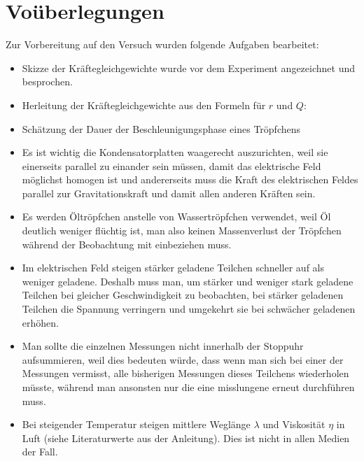 \documentclass[
	a4paper,
	12pt,
	pagesize,
	ngerman
]{scrartcl}
\begin{document}
	\section{Voüberlegungen}
	Zur Vorbereitung auf den Versuch wurden folgende Aufgaben bearbeitet:
	\begin{itemize}
		\item Skizze der Kräftegleichgewichte wurde vor dem Experiment angezeichnet und besprochen.
		\item Herleitung der Kräftegleichgewichte aus den Formeln für $ r $ und $ Q $: %
		\item Schätzung der Dauer der Beschleunigungsphase eines Tröpfchens %
		\item Es ist wichtig die Kondensatorplatten waagerecht auszurichten, weil sie einerseits parallel zu einander sein müssen, damit das elektrische Feld möglichst homogen ist und andererseits muss die Kraft des elektrischen Feldes parallel zur Gravitationskraft und damit allen anderen Kräften sein.
		\item Es werden Öltröpfchen anstelle von Wassertröpfchen verwendet, weil Öl deutlich weniger flüchtig ist, man also keinen Massenverlust der Tröpfchen während der Beobachtung mit einbeziehen muss.
		\item Im elektrischen Feld steigen stärker geladene Teilchen schneller auf als weniger geladene. Deshalb muss man, um stärker und weniger stark geladene Teilchen bei gleicher Geschwindigkeit zu beobachten, bei stärker geladenen Teilchen die Spannung verringern und umgekehrt sie bei schwächer geladenen erhöhen.
		\item Man sollte die einzelnen Messungen nicht innerhalb der Stoppuhr aufsummieren, weil dies bedeuten würde, dass wenn man sich bei einer der Messungen vermisst, alle bisherigen Messungen dieses Teilchens wiederholen müsste, während man ansonsten nur die eine misslungene erneut durchführen muss.
		\item Bei steigender Temperatur steigen mittlere Weglänge $ \lambda $ und Viskosität $ \eta $ in Luft (siehe Literaturwerte aus der Anleitung). %
		Dies ist nicht in allen Medien der Fall.
	\end{itemize}
	
\end{document}
